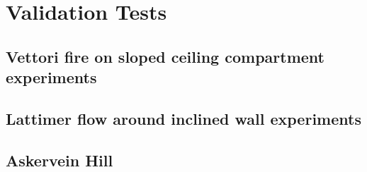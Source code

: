 \documentclass[12pt]{article}
\begin{document}
\clearpage

\section{Validation Tests}

\subsection{Vettori fire on sloped ceiling compartment experiments}





\subsection{Lattimer flow around inclined wall experiments}





\subsection{Askervein Hill}
\end{document}
